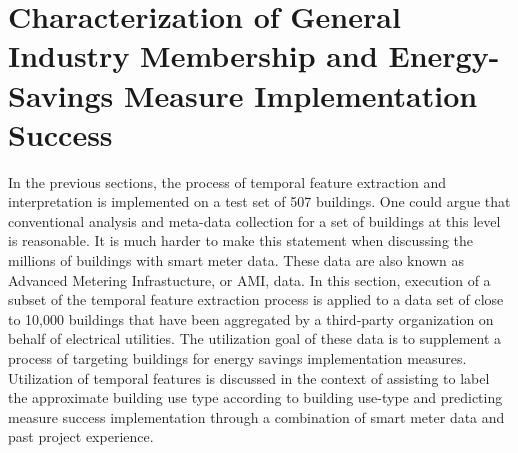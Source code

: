\section{Characterization of General Industry Membership and Energy-Savings Measure Implementation Success}
\label{sec:scalability}

In the previous sections, the process of temporal feature extraction and interpretation is implemented on a test set of 507 buildings. One could argue that conventional analysis and meta-data collection for a set of buildings at this level is reasonable. It is much harder to make this statement when discussing the millions of buildings with smart meter data. These data are also known as Advanced Metering Infrastucture, or AMI, data.  In this section, execution of a subset of the temporal feature extraction process is applied to a data set of close to 10,000 buildings that have been aggregated by a third-party organization on behalf of electrical utilities. The utilization goal of these data is to supplement a process of targeting buildings for energy savings implementation measures. Utilization of temporal features is discussed in the context of assisting to label the approximate building use type according to building use-type and predicting measure success implementation through a combination of smart meter data and past project experience.


